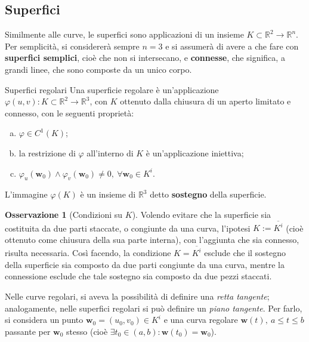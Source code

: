 \documentclass[10pt, a4paper]{scrartcl}
\theoremstyle{definition}
\numberwithin{esempio}{section}
\theoremstyle{definition}
\newtheorem{obs}{Osservazione}
\numberwithin{obs}{section}
\numberwithin{nota}{section}
\numberwithin{equation}{subsection}
\begin{document}
\subsection{Superfici}
Similmente alle curve, le superfici sono applicazioni di un insieme $K \subset \mathbb{R}^2 \to \mathbb{R}^n$. 
Per semplicit\`a, si considerer\`a sempre $n=3$ e si assumer\`a di avere a che fare con \textbf{superfici semplici}, cio\`e che non si intersecano, e \textbf{connesse}, che significa, a grandi linee, che sono composte da un unico corpo.
\begin{definizione}
	{Superfici regolari}{}
Una superficie regolare \`e un'applicazione $\varphi (u,v):K \subset \mathbb{R}^2 \to \mathbb{R}^3$, con $K$ ottenuto dalla chiusura di un aperto limitato e connesso, con le seguenti propriet\`a:
\begin{enumerate}[(a).]
	\item $\varphi \in C^1(K)$;
	\item la restrizione di $\varphi $ all'interno di $K$ \`e un'applicazione iniettiva;
	\item $\varphi _u (\mathbf{w}_0) \wedge \varphi _v(\mathbf{w} _0) \neq  0 , \ \forall \mathbf{w} _0 \in K^i$.
\end{enumerate}
L'immagine $\varphi (K)$ \`e un insieme di $\mathbb{R}^3$ detto \textbf{sostegno} della superficie.
\end{definizione}
\begin{obs}
	[Condizioni su $K$]
Volendo evitare che la superficie sia costituita da due parti staccate, o congiunte da una curva, l'ipotesi $K:= \overline{K^i}$ (cio\`e ottenuto come chiusura della sua parte interna), con l'aggiunta che sia connesso, risulta necessaria. 
Cos\`i facendo, la condizione $K = \overline{K^i}$ esclude che il sostegno della superficie sia composto da due parti congiunte da una curva, mentre la connessione esclude che tale sostegno sia composto da due pezzi staccati.
\end{obs}
Nelle curve regolari, si aveva la possibilit\`a di definire una \textit{retta tangente}; analogamente, nelle superfici regolari si pu\`o definire un \textit{piano tangente}.
Per farlo, si considera un punto $\mathbf{w} _0 = (u_0,v_0) \in K^i$ e una curva regolare $\mathbf{w} (t), \ a \le t\le b$ passante per $\mathbf{w} _0 $ stesso (cio\`e $\exists t_0 \in (a,b) : \mathbf{w} (t_0) = \mathbf{w} _0$).
\end{document}
